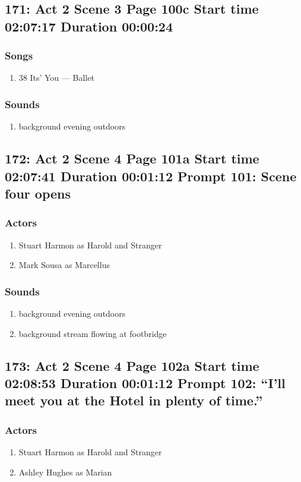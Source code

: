 \subsection{171: Act 2 Scene 3 Page 100c Start time 02:07:17 Duration 00:00:24}
\subsubsection{Songs}
\begin{enumerate}
\item 38 Its' You --- Ballet
\end{enumerate}\subsubsection{Sounds}
\begin{enumerate}
\item background evening outdoors
\end{enumerate}
\subsection{172: Act 2 Scene 4 Page 101a Start time 02:07:41 Duration 00:01:12 Prompt 101: Scene four opens}

\subsubsection{Actors}
\begin{enumerate}
\item Stuart Harmon as Harold and Stranger
\item Mark Sousa as Marcellus
\end{enumerate}

\subsubsection{Sounds}
\begin{enumerate}
\item background evening outdoors
\item background stream flowing at footbridge
\end{enumerate}
\subsection{173: Act 2 Scene 4 Page 102a Start time 02:08:53 Duration 00:01:12 Prompt 102: ``I'll meet you at the Hotel in plenty of time.''}

\subsubsection{Actors}
\begin{enumerate}
\item Stuart Harmon as Harold and Stranger
\item Ashley Hughes as Marian
\end{enumerate}

